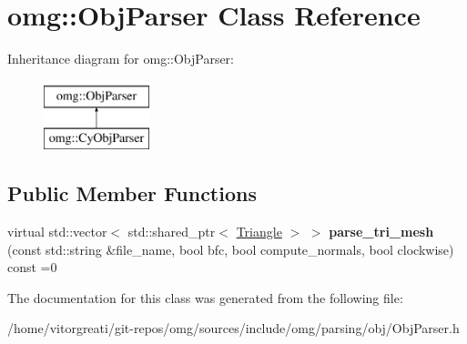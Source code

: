 \hypertarget{classomg_1_1_obj_parser}{}\section{omg\+::Obj\+Parser Class Reference}
\label{classomg_1_1_obj_parser}
Inheritance diagram for omg\+::Obj\+Parser\+:\begin{figure}[H]
\begin{center}
\leavevmode
\includegraphics[height=2.000000cm]{classomg_1_1_obj_parser}
\end{center}
\end{figure}
\subsection*{Public Member Functions}
\begin{DoxyCompactItemize}
\item 
\mbox{\label{classomg_1_1_obj_parser_af0ce4b5ea4435db10a0b62e092ff5bcc}} 
virtual std\+::vector$<$ std\+::shared\+\_\+ptr$<$ \mbox{\hyperlink{classomg_1_1_triangle}{Triangle}} $>$ $>$ {\bfseries parse\+\_\+tri\+\_\+mesh} (const std\+::string \&file\+\_\+name, bool bfc, bool compute\+\_\+normals, bool clockwise) const =0
\end{DoxyCompactItemize}


The documentation for this class was generated from the following file\+:\begin{DoxyCompactItemize}
\item 
/home/vitorgreati/git-\/repos/omg/sources/include/omg/parsing/obj/Obj\+Parser.\+h\end{DoxyCompactItemize}
